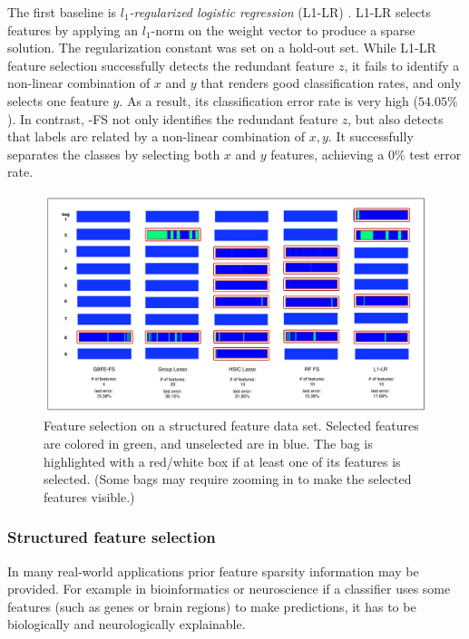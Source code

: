 The first baseline is \emph{$l_1$-regularized logistic regression} (L1-LR) \cite{lee2006efficient,park2007l1}. L1-LR selects features by applying an $l_1$-norm on the weight vector to produce a sparse solution. The regularization constant was set on a hold-out set. While L1-LR feature selection successfully detects the redundant feature $z$, it fails to identify a non-linear combination of $x$ and $y$ that renders good classification rates, and only selects one feature $y$. As a result, its classification error rate is very high ($54.05\%$). In contrast, \name{}-FS not only identifies the redundant feature $z$, but also detects that labels are related by a non-linear combination of $x,y$. It successfully separates the classes by selecting both $x$ and $y$ features, achieving a $0\%$ test error rate. 

\begin{figure}[t!!!]
\centerline{
\includegraphics[width = 1\textwidth]{plots/biology_horizental}
}
\caption{Feature selection on a structured feature data set. Selected features are colored in green, and unselected are in blue. The bag is highlighted with a red/white box if at least one of its features is selected. (Some bags may require zooming in to make the selected features visible.)}
\label{fig:bag}
\end{figure}

\subsubsection{Structured feature selection}
In many real-world applications prior feature sparsity information may be provided. For example in bioinformatics or neuroscience if a classifier uses some features (such as genes or brain regions) to make predictions, it has to be biologically and neurologically explainable.


